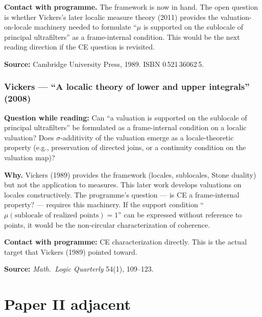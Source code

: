 \medskip\noindent
\textbf{Contact with programme.}  The framework is now in hand.
The open question is whether Vickers's later localic measure theory
(2011) provides the valuation-on-locale machinery needed to
formulate ``$\mu$ is supported on the sublocale of principal
ultrafilters'' as a frame-internal condition.  This would be the
next reading direction if the CE question is revisited.

\medskip\noindent
\textbf{Source:} Cambridge University Press, 1989.  ISBN 0\,521\,36062\,5.

\section{Vickers --- ``A localic theory of lower and upper
integrals'' (2008)}

\textbf{Question while reading:} Can ``a valuation is supported on
the sublocale of principal ultrafilters'' be formulated as a
frame-internal condition on a localic valuation?  Does
$\sigma$-additivity of the valuation emerge as a locale-theoretic
property (e.g., preservation of directed joins, or a continuity
condition on the valuation map)?

\medskip\noindent
\textbf{Why.}  Vickers (1989) provides the framework (locales,
sublocales, Stone duality) but not the application to measures.
This later work develops valuations on locales constructively.
The programme's question --- is CE a frame-internal property? ---
requires this machinery.  If the support condition
``$\mu(\text{sublocale of realized points}) = 1$'' can be expressed
without reference to points, it would be the non-circular
characterization of coherence.

\medskip\noindent
\textbf{Contact with programme:} CE characterization directly.
This is the actual target that Vickers (1989) pointed toward.

\medskip\noindent
\textbf{Source:} \emph{Math.\ Logic Quarterly} 54(1), 109--123.


\part{Paper II adjacent}

